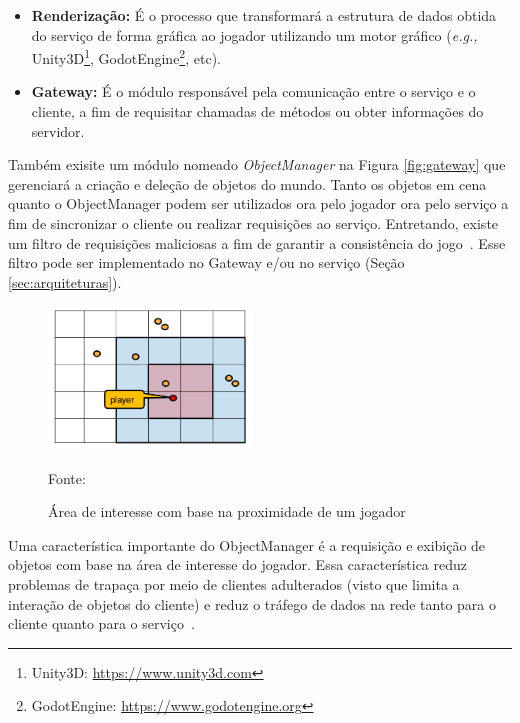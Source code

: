 \begin{itemize}
  \item \textbf{Renderização:} É o processo que transformará a estrutura de dados obtida do serviço de forma gráfica ao jogador utilizando um motor gráfico (\textit{e.g.,} Unity3D\footnote{Unity3D: \url{https://www.unity3d.com}}, GodotEngine\footnote{GodotEngine: \url{https://www.godotengine.org}}, etc).
  \item \textbf{Gateway:} É o módulo responsável pela comunicação entre o serviço e o cliente, a fim de requisitar chamadas de métodos ou obter informações do servidor.
\end{itemize}



Também exisite um módulo nomeado \textit{ObjectManager} na Figura \ref{fig:gateway} que gerenciará a criação e deleção de objetos do mundo.
%
Tanto os objetos em cena quanto o ObjectManager podem ser utilizados ora pelo jogador ora pelo serviço a fim de sincronizar o cliente ou realizar requisições ao serviço.
%
Entretando, existe um filtro de requisições maliciosas a fim de garantir a consistência do jogo~\cite{albion_online_unite}.
%
Esse filtro pode ser implementado no Gateway e/ou no serviço (Seção \ref{sec:arquiteturas}).



\begin{figure}[htb!]
\caption{Área de interesse com base na proximidade de um jogador}
\label{fig:proximidade}
\includegraphics[height=3.8cm]{img/cap2/proximidade.png}
\centering

Fonte:~\cite{albion_online_unite}
\end{figure}



Uma característica importante do ObjectManager é a requisição e exibição de objetos com base na área de interesse do jogador.
%
Essa característica reduz problemas de trapaça por meio de clientes adulterados (visto que limita a interação de objetos do cliente) e reduz o tráfego de dados na rede tanto para o cliente quanto para o serviço~\cite{albion_online_unite, stephenclarkewillson2017}.



